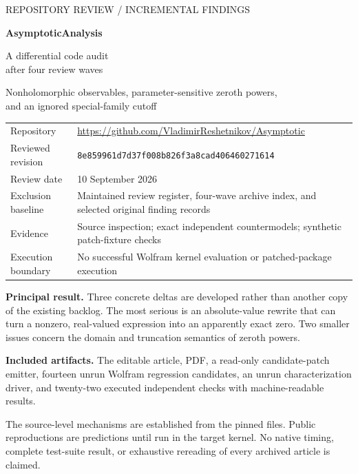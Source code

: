 \documentclass[11pt,letterpaper]{article}
\newcommand{\commit}{8e859961d7d37f008b826f3a8cad406460271614}
\begin{document}
\begin{titlepage}
\vspace*{0.3in}
{\small\sffamily\color{ink}REPOSITORY REVIEW \quad / \quad INCREMENTAL FINDINGS}
\vspace{0.32in}

{\Huge\bfseries\color{ink}AsymptoticAnalysis}\par
\vspace{0.12in}
{\LARGE A differential code audit\\after four review waves}\par
\vspace{0.35in}
{\large Nonholomorphic observables, parameter-sensitive zeroth powers,\\and an ignored special-family cutoff}
\vspace{0.4in}

\begin{tabularx}{\textwidth}{@{}lX@{}}
\toprule
Repository & \url{https://github.com/VladimirReshetnikov/Asymptotic}\\
Reviewed revision & \texttt{\commit}\\
Review date & 10 September 2026\\
Exclusion baseline & Maintained review register, four-wave archive index, and selected original finding records\\
Evidence & Source inspection; exact independent countermodels; synthetic patch-fixture checks\\
Execution boundary & No successful Wolfram kernel evaluation or patched-package execution\\
\bottomrule
\end{tabularx}

\vspace{0.33in}
\textbf{Principal result.} Three concrete deltas are developed rather than another copy of the existing backlog. The most serious is an absolute-value rewrite that can turn a nonzero, real-valued expression into an apparently exact zero. Two smaller issues concern the domain and truncation semantics of zeroth powers.

\vspace{0.13in}
\textbf{Included artifacts.} The editable article, PDF, a read-only candidate-patch emitter, fourteen unrun Wolfram regression candidates, an unrun characterization driver, and twenty-two executed independent checks with machine-readable results.

\vfill
{\small The source-level mechanisms are established from the pinned files. Public reproductions are predictions until run in the target kernel. No native timing, complete test-suite result, or exhaustive rereading of every archived article is claimed.}
\end{titlepage}
\end{document}
